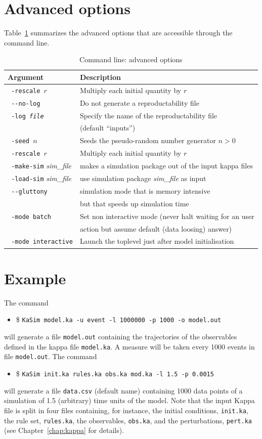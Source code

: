 \documentclass[11pt]{book}
\def\ttt#1{\texttt{#1}}
\def\ITE#1{\begin{itemize}#1\end{itemize}}
\def\dd{-\hspace{0.001cm}-}
\begin{document}
\section{Advanced options}

Table~\ref{tab:add-options} summarizes the advanced options that are accessible through the command line.

\begin{table}[h!]
\caption{Command line: advanced options}
\centering
\begin{tabular}{|l|l|}
\hline
Argument & Description \\ \hline
\ttt{ -rescale $r$} & Multiply each initial quantity by $r$ \\
\ttt{ \dd no-log} & Do not generate a reproductability file \\
\ttt{ -log \textit{file}} & Specify the name of the reproductability file \\
& (default ``inputs'') \\
\ttt{ -seed $n$} & Seeds the pseudo-random number generator $n>0$ \\
\ttt{ -rescale $r$} & Multiply each initial quantity by $r$ \\
\ttt{ -make-sim} \textit{sim\_file} & makes a simulation package out of the input kappa files \\
\ttt{ -load-sim} \textit{sim\_file} & use simulation package \textit{sim\_file} as input\\
\ttt{ \dd gluttony} & simulation mode that is memory intensive \\ & but that speeds up simulation time\\
\ttt{ -mode batch} & Set non interactive mode (never halt waiting for an user\\
& action but assume default (data loosing) answer)\\
\ttt{ -mode interactive} & Launch the toplevel just after model initialisation\\
\hline
\end{tabular}
\label{tab:add-options}
\end{table}%
%

\section{Example}
The command
\ITE{
\item[\$] \ttt{KaSim model.ka -u event -l 1000000 -p 1000 -o model.out}
}
will generate a file \ttt{model.out} containing the trajectories of the observables defined in the kappa file \ttt{model.ka}. A measure will be taken every 1000 events in file \ttt{model.out}. The command
\ITE{
\item[\$] \ttt{KaSim init.ka rules.ka obs.ka mod.ka -l 1.5 -p 0.0015}
}
will generate a file \ttt{data.csv} (default name) containing 1000 data points of a simulation of 1.5 (arbitrary) time units of the model. Note that the input Kappa file is split in four files containing, for instance, the initial conditions, \ttt{init.ka}, the rule set, \ttt{rules.ka}, the observables, \ttt{obs.ka}, and the perturbations, \ttt{pert.ka} (see Chapter~\ref{chap:kappa} for details). %
\end{document}

